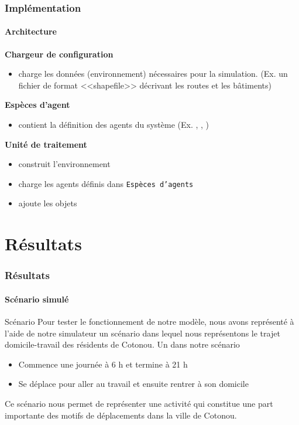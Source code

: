 \begin{frame}
    \frametitle{Implémentation}
    \framesubtitle{Architecture}
    \textbf{Chargeur de configuration}
    \begin{itemize}
        \item charge les données (environnement) nécessaires pour la simulation. (Ex. un fichier de format <<shapefile>> décrivant les routes et les bâtiments)

    \end{itemize}

    \textbf{Espèces d'agent}
    \begin{itemize}
        \item contient la définition des agents du système (Ex. \aTMoto{}, \aTBus{}, \aPolicier{})
    \end{itemize}

    \textbf{Unité de traitement}
    \begin{itemize}
        \item construit l'environnement
        \item charge les agents définis dans \texttt{Espèces d'agents}
        \item ajoute les objets
    \end{itemize}

\end{frame}


\section{Résultats}\label{results}
\begin{frame}
    \frametitle{Résultats}
    \framesubtitle{Scénario simulé}

    \begin{block}{Scénario}
        Pour tester le fonctionnement de notre modèle, nous avons représenté à l'aide de notre simulateur un scénario dans lequel nous représentons le trajet domicile-travail des résidents de Cotonou.
        Un \aConducteur{} dans notre scénario
        \begin{itemize}
            \item Commence une journée à 6 h et termine à 21 h
            \item Se déplace pour aller au travail et ensuite rentrer à son domicile
        \end{itemize}
        Ce scénario nous permet de représenter une activité qui constitue une part importante des motifs de déplacements dans la ville de Cotonou.
    \end{block}

\end{frame}


